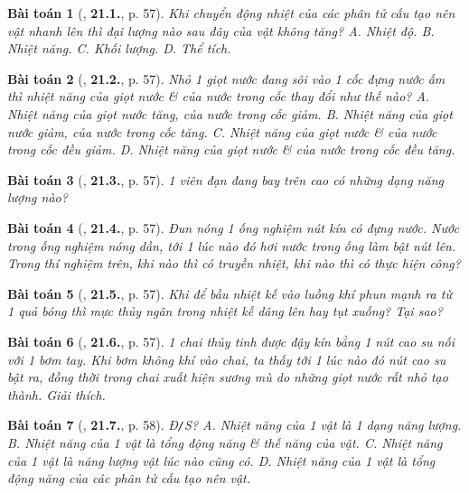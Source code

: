 \documentclass{article}
\numberwithin{equation}{section}
\newtheorem{baitoan}{Bài toán}
\begin{document}
\begin{baitoan}[\cite{SBT_Vat_Ly_8}, \textbf{21.1.}, p. 57]
	Khi chuyển động nhiệt của các phân tử cấu tạo nên vật nhanh lên thì đại lượng nào sau đây của vật không tăng? {\sf A.} Nhiệt độ. {\sf B.} Nhiệt năng. {\sf C.} Khối lượng. {\sf D.} Thể tích.
\end{baitoan}

\begin{baitoan}[\cite{SBT_Vat_Ly_8}, \textbf{21.2.}, p. 57]
	Nhỏ 1 giọt nước đang sôi vào 1 cốc đựng nước ấm thì nhiệt năng của giọt nước \& của nước trong cốc thay đổi như thế nào? {\sf A.} Nhiệt năng của giọt nước tăng, của nước trong cốc giảm. {\sf B.} Nhiệt năng của giọt nước giảm, của nước trong cốc tăng. {\sf C.} Nhiệt năng của giọt nước \& của nước trong cốc đều giảm. {\sf D.} Nhiệt năng của giọt nước \& của nước trong cốc đều tăng.
\end{baitoan}

\begin{baitoan}[\cite{SBT_Vat_Ly_8}, \textbf{21.3.}, p. 57]
	1 viên đạn đang bay trên cao có những dạng năng lượng nào?
\end{baitoan}

\begin{baitoan}[\cite{SBT_Vat_Ly_8}, \textbf{21.4.}, p. 57]
	Đun nóng 1 ống nghiệm nút kín có đựng nước. Nước trong ống nghiệm nóng dần, tới 1 lúc nào đó hơi nước trong ống làm bật nút lên. Trong thí nghiệm trên, khi nào thì có truyền nhiệt, khi nào thì có thực hiện công? 
\end{baitoan}

\begin{baitoan}[\cite{SBT_Vat_Ly_8}, \textbf{21.5.}, p. 57]
	Khi để bầu nhiệt kế vào luồng khí phun mạnh ra từ 1 quả bóng thì mực thủy ngân trong nhiệt kế dâng lên hay tụt xuống? Tại sao?
\end{baitoan}

\begin{baitoan}[\cite{SBT_Vat_Ly_8}, \textbf{21.6.}, p. 57]
	1 chai thủy tinh được đậy kín bằng 1 nút cao su nối với 1 bơm tay. Khi bơm không khí vào chai, ta thấy tới 1 lúc nào đó nút cao su bật ra, đồng thời trong chai xuất hiện sương mù do những giọt nước rất nhỏ tạo thành. Giải thích.
\end{baitoan}

\begin{baitoan}[\cite{SBT_Vat_Ly_8}, \textbf{21.7.}, p. 58]
	\emph{Đ\texttt{/}S?} {\sf A.} Nhiệt năng của 1 vật là 1 dạng năng lượng. {\sf B.} Nhiệt năng của 1 vật là tổng động năng \& thế năng của vật. {\sf C.} Nhiệt năng của 1 vật là năng lượng vật lúc nào cũng có. {\sf D.} Nhiệt năng của 1 vật là tổng động năng của các phân tử cấu tạo nên vật.
\end{baitoan}
\end{document}

